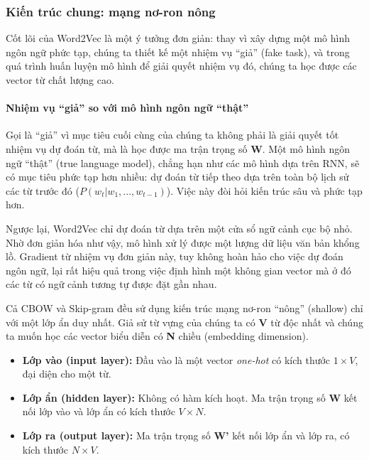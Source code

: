 \subsubsection{Kiến trúc chung: mạng nơ-ron nông}
\label{sssec:w2v_architecture}
Cốt lõi của Word2Vec là một ý tưởng đơn giản: thay vì xây dựng một mô hình ngôn ngữ phức tạp, chúng ta thiết kế một nhiệm vụ “giả” (fake task), và trong quá trình huấn luyện mô hình để giải quyết nhiệm vụ đó, chúng ta học được các vector từ chất lượng cao.

\paragraph{Nhiệm vụ “giả” so với mô hình ngôn ngữ “thật”}
Gọi là “giả” vì mục tiêu cuối cùng của chúng ta không phải là giải quyết tốt nhiệm vụ dự đoán từ, mà là học được ma trận trọng số \textbf{W}. Một mô hình ngôn ngữ “thật” (true language model), chẳng hạn như các mô hình dựa trên RNN, sẽ có mục tiêu phức tạp hơn nhiều: dự đoán từ tiếp theo dựa trên toàn bộ lịch sử các từ trước đó ($P(w_t | w_1, ..., w_{t-1})$). Việc này đòi hỏi kiến trúc sâu và phức tạp hơn.

Ngược lại, Word2Vec chỉ dự đoán từ dựa trên một cửa sổ ngữ cảnh cục bộ nhỏ. Nhờ đơn giản hóa như vậy, mô hình xử lý được một lượng dữ liệu văn bản khổng lồ. Gradient từ nhiệm vụ đơn giản này, tuy không hoàn hảo cho việc dự đoán ngôn ngữ, lại rất hiệu quả trong việc định hình một không gian vector mà ở đó các từ có ngữ cảnh tương tự được đặt gần nhau.

Cả CBOW và Skip-gram đều sử dụng kiến trúc mạng nơ-ron “nông” (shallow) chỉ với một lớp ẩn duy nhất. Giả sử từ vựng của chúng ta có \textbf{V} từ độc nhất và chúng ta muốn học các vector biểu diễn có \textbf{N} chiều (embedding dimension).

\begin{itemize}
    \item \textbf{Lớp vào (input layer):} Đầu vào là một vector \textit{one-hot} có kích thước $1 \times V$, đại diện cho một từ.
    \item \textbf{Lớp ẩn (hidden layer):} Không có hàm kích hoạt. Ma trận trọng số \textbf{W} kết nối lớp vào và lớp ẩn có kích thước $V \times N$.
    \item \textbf{Lớp ra (output layer):} Ma trận trọng số \textbf{W'} kết nối lớp ẩn và lớp ra, có kích thước $N \times V$.
\end{itemize}

